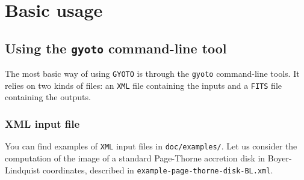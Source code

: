 \documentclass[a4paper,12pt]{article}
\begin{document}
\section{Basic usage}
\subsection{Using the \texttt{gyoto} command-line tool}
\label{demo}

The most basic way of using \texttt{GYOTO} is through the
\texttt{gyoto} command-line tools. It relies on two kinds of files: an
\texttt{XML} file containing the inputs and a \texttt{FITS} file
containing the outputs.

\subsubsection{XML input file}

You can find examples of \texttt{XML} input files in \texttt{doc/examples/}. Let us consider the computation of the image of a standard Page-Thorne accretion disk in Boyer-Lindquist coordinates, described in \texttt{example-page-thorne-disk-BL.xml}. 
\end{document}
